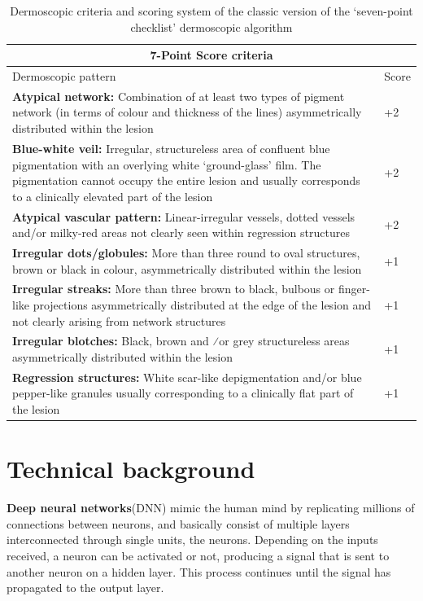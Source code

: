 \begin{table}[]
\begin{tabular}{ |p{12cm}|p{0.8cm}|}
 \hline
 \multicolumn{2}{|c|}{\textbf{7-Point Score criteria}} \\
 \hline
 Dermoscopic pattern & Score \\
 \hline
 \textbf{Atypical network:} Combination of at least two types of pigment network (in terms of colour and thickness of the lines) asymmetrically distributed within the lesion & +2\\
 \textbf{Blue-white veil:} Irregular, structureless area of confluent blue pigmentation with an overlying white ‘ground-glass’ film. The pigmentation cannot occupy the entire lesion and usually corresponds to a clinically elevated part of the lesion & +2\\
 \textbf{Atypical vascular pattern:} Linear-irregular vessels, dotted vessels and/or milky-red areas not clearly seen within regression structures & +2 \\
\textbf{Irregular dots/globules:} More than three round to oval structures, brown or black in colour, asymmetrically distributed within the lesion & +1 \\
\textbf{Irregular streaks:} More than three brown to black, bulbous or finger-like projections asymmetrically distributed at the edge of the lesion and not clearly arising from network structures & +1 \\
\textbf{Irregular blotches:} Black, brown and ⁄or grey structureless areas asymmetrically distributed within the lesion & +1 \\
\textbf{Regression structures:} White scar-like depigmentation and/or blue pepper-like granules usually corresponding to a clinically flat part of the lesion & +1 \\
\hline
\end{tabular}
\caption{Dermoscopic criteria and scoring system of the classic version of the ‘seven-point checklist’ dermoscopic algorithm}
\label{table:1}
\end{table}
\clearpage
\section{Technical background}
\textbf{Deep neural networks}(DNN) mimic the human mind by replicating millions of connections between neurons, and basically consist of multiple layers interconnected through single units, the neurons. Depending on the inputs received, a neuron can be activated or not, producing a signal that is sent to another neuron on a hidden layer. This process continues until the signal has propagated to the output layer.
